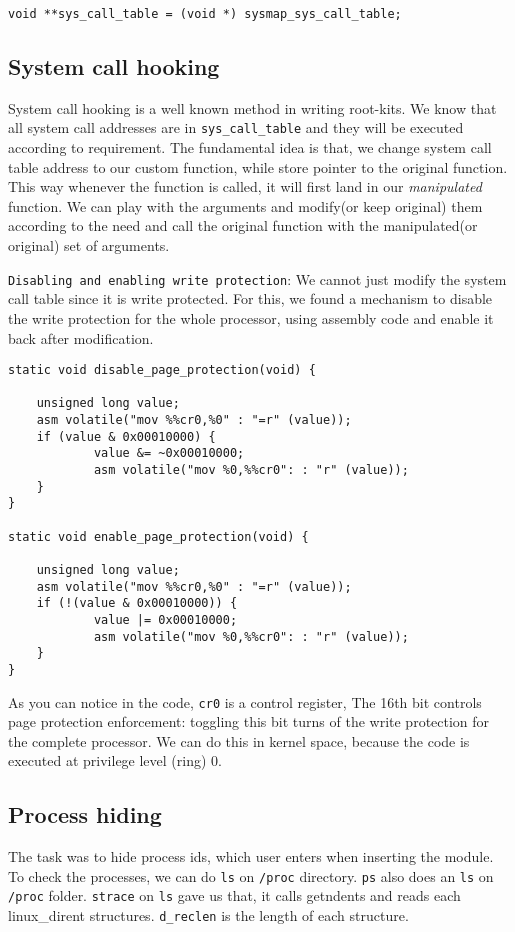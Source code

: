 \documentclass[10pt, letterpaper]{scrartcl}
\begin{document}
\begin{verbatim}
void **sys_call_table = (void *) sysmap_sys_call_table;
\end{verbatim}

\subsection{System call hooking}
System call hooking is a well known method in writing root-kits. 
We know that all system call addresses are in \texttt{sys\_call\_table} and they will be executed according to requirement.
The fundamental idea is that, we change system call table address to our custom function, 
while store pointer to the original function. This way whenever the function is called, 
it will first land in our {\em manipulated} function. 
We can play with the arguments and modify(or keep original) them according to the need and call the original function with the manipulated(or original) set of arguments. 

\texttt{Disabling and enabling write protection}: 
We cannot just modify the system call table since it is write protected. 
For this, we found a mechanism to disable the write protection for the whole processor, 
using assembly code and enable it back after modification.

\begin{verbatim}
static void disable_page_protection(void) {

    unsigned long value;
    asm volatile("mov %%cr0,%0" : "=r" (value));
    if (value & 0x00010000) {
            value &= ~0x00010000;
            asm volatile("mov %0,%%cr0": : "r" (value));
    }
}

static void enable_page_protection(void) {

    unsigned long value;
    asm volatile("mov %%cr0,%0" : "=r" (value));
    if (!(value & 0x00010000)) {
            value |= 0x00010000;
            asm volatile("mov %0,%%cr0": : "r" (value));
    }
}
\end{verbatim}

As you can notice in the code, \texttt{cr0} is a control register, 
The 16th bit controls page protection enforcement: 
toggling this bit turns of the write protection for the complete processor.
We can do this in kernel space, because the code is executed at privilege level (ring) 0. 

\subsection{Process hiding}
The task was to hide process ids, which user enters when inserting the module. 
To check the processes, we can do \texttt{ls} on \texttt{/proc} directory. 
\texttt{ps} also does an \texttt{ls} on \texttt{/proc} folder.   
\texttt{strace} on \texttt{ls} gave us that, it calls getndents and reads each linux\_dirent structures. 
\texttt{d\_reclen} is the length of each structure. 
\end{document}
